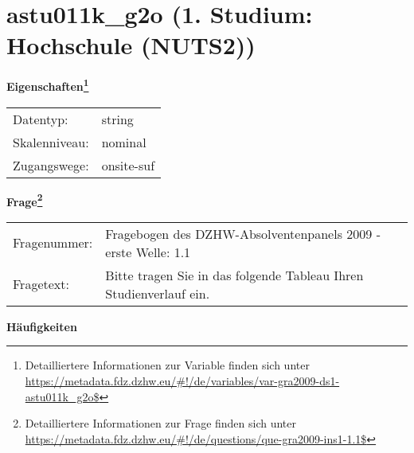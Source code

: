 
    \setcounter{footnote}{0}

    \vspace*{-1.8cm}
	\section{astu011k\_g2o (1. Studium: Hochschule (NUTS2))}
	\label{section:astu011k_g2o}



    \vspace*{0.5cm}
    \noindent\textbf{Eigenschaften\footnote{Detailliertere Informationen zur Variable finden sich unter
		\url{https://metadata.fdz.dzhw.eu/\#!/de/variables/var-gra2009-ds1-astu011k_g2o$}}}\\
	\begin{tabularx}{\hsize}{@{}lX}
	Datentyp: & string \\
	Skalenniveau: & nominal \\
	Zugangswege: &
	  onsite-suf
 \\
    \end{tabularx}



				\vspace*{0.5cm}
                \noindent\textbf{Frage\footnote{Detailliertere Informationen zur Frage finden sich unter
		              \url{https://metadata.fdz.dzhw.eu/\#!/de/questions/que-gra2009-ins1-1.1$}}}\\
				\begin{tabularx}{\hsize}{@{}lX}
					Fragenummer: &
					  Fragebogen des DZHW-Absolventenpanels 2009 - erste Welle:
					  1.1
 \\
					Fragetext: & Bitte tragen Sie in das folgende Tableau Ihren Studienverlauf ein. \\
				\end{tabularx}





        		\vspace*{0.5cm}
                \noindent\textbf{Häufigkeiten}

